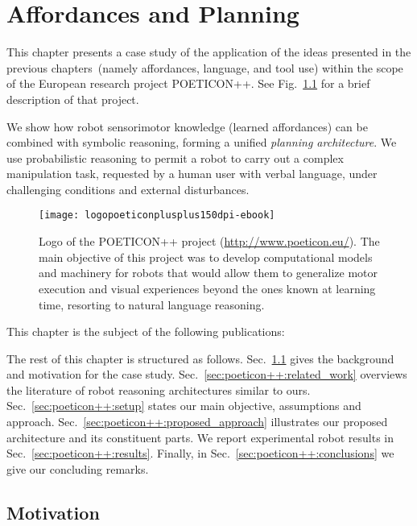 
\chapter{Affordances and Planning}
\label{chap:poeticon++_case_study}

This chapter presents a case study of the application of the ideas presented in the previous chapters~(namely affordances, language, and tool use) within the scope of the European research project POETICON++.
See Fig.~\ref{fig:poeticon++_logo_and_description} for a brief description of that project.

We show how robot sensorimotor knowledge (learned affordances) can be combined with symbolic reasoning, forming a unified \emph{planning architecture}.
We use probabilistic reasoning to permit a robot to carry out a complex manipulation task, requested by a human user with verbal language, under challenging conditions and external disturbances.

\begin{figure}
\centering
\texttt{[image: logopoeticonplusplus150dpi-ebook]} %
\caption[Logo of the POETICON++ project.]{Logo of the POETICON++ project \allowbreak (\url{http://www.poeticon.eu/}).
The main objective of this project was to develop computational models and machinery for robots that would allow them to generalize motor execution and visual experiences beyond the ones known at learning time, resorting to natural language reasoning.}
\label{fig:poeticon++_logo_and_description}
\end{figure}

This chapter is the subject of the following publications:
\listPublicationsPoeticonpp

The rest of this chapter is structured as follows.
Sec.~\ref{sec:poeticon++:motivation} gives the background and motivation for the case study.
Sec.~\ref{sec:poeticon++:related_work} overviews the literature of robot reasoning architectures similar to ours.
Sec.~\ref{sec:poeticon++:setup} states our main objective, assumptions and approach.
Sec.~\ref{sec:poeticon++:proposed_approach} illustrates our proposed architecture and its constituent parts.
We report experimental robot results in Sec.~\ref{sec:poeticon++:results}.
Finally, in Sec.~\ref{sec:poeticon++:conclusions} we give our concluding remarks.

\section{Motivation}
\label{sec:poeticon++:motivation}

